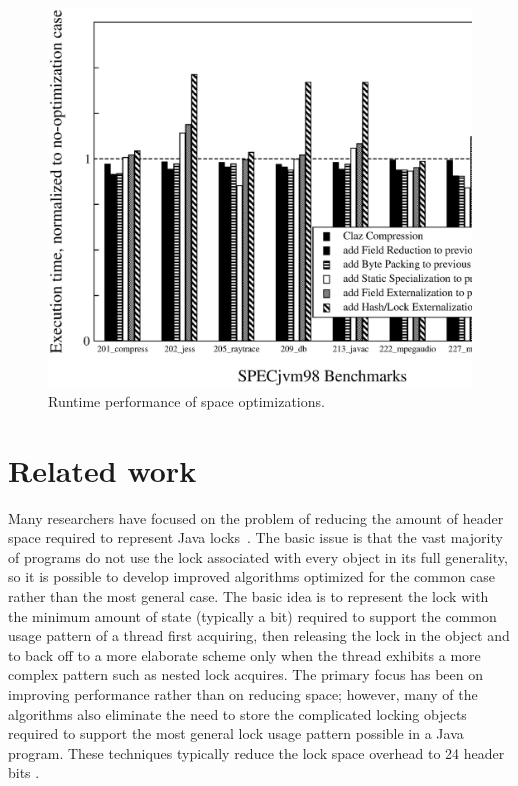 \documentclass{acmconf}
\begin{document}
\begin{figure}
\includegraphics[scale=0.32,clip=true]{Figures/oopsla-speed.eps}
\caption{Runtime performance of space optimizations.}
\label{fig:performance}
\end{figure}


\section{Related work}

Many researchers have focused on the problem of reducing the amount of
header space required to represent Java
locks~\cite{BKMS98,OK99,ADGKRW99}. The basic issue is that the vast
majority of programs do not use the lock associated with every object
in its full generality, so it is possible to develop improved
algorithms optimized for the common case rather than the most general
case. The basic idea is to represent the lock with the minimum amount
of state (typically a bit) required to support the common usage
pattern of a thread first acquiring, then releasing the lock in the
object and to back off to a more elaborate scheme only when the thread
exhibits a more complex pattern such as nested lock acquires. The
primary focus has been on improving performance rather than on
reducing space; however, many of the algorithms also eliminate the
need to store the complicated locking objects required to support the
most general lock usage pattern possible in a Java program. These
techniques typically reduce the lock space overhead to 24 header bits
\cite{BKMS98}.
\end{document}
